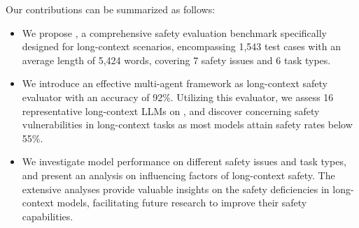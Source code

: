 Our contributions can be summarized as follows:
\begin{itemize}
    \item We propose \benchmark, a comprehensive safety evaluation benchmark specifically designed for long-context scenarios, encompassing 1,543 test cases with an average length of 5,424 words, covering 7 safety issues and 6 task types.
    \item We introduce an effective multi-agent framework as long-context safety evaluator with an accuracy of 92\%. Utilizing this evaluator, we assess 16 representative long-context LLMs on \benchmark, and discover concerning safety vulnerabilities in long-context tasks as most models attain safety rates below 55\%.
    \item We investigate model performance on different safety issues and task types, and present an analysis on influencing factors of long-context safety. The extensive analyses provide valuable insights on the safety deficiencies in long-context models, facilitating future research to improve their safety capabilities.
\end{itemize}


